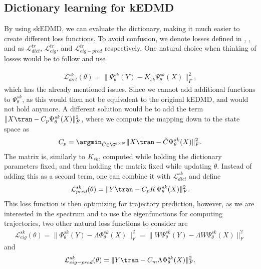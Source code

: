 \documentclass{article}
\begin{document}
\subsection{Dictionary learning for kEDMD}
By using skEDMD, we can evaluate the dictionary, making it much easier to create different loss functions. To avoid confusion, we denote losses defined in , , and  as \(\mathcal{L}^{tr}_{dict}\), \(\mathcal{L}^{tr}_{eig}\), and \(\mathcal{L}^{tr}_{eig-pred}\) respectively. One natural choice when thinking of losses would be to follow  and use

\begin{align*}
    \mathcal{L}^{sk}_{dict}(\theta) = \lVert \Psi^{sk}_{\theta}(Y) - K_{sk} \Psi^{sk}_{\theta}(X)\rVert_F^2,
\end{align*}
which has the already mentioned issues. Since we cannot add additional functions to \(\Psi^{sk}_{\theta}\), as this would then not be equivalent to the original kEDMD, and  would not hold anymore. A different solution would be to add the term \(\lVert X\tran - C_p\Psi^{sk}_{\theta}(X)\rVert^2_F\), where we compute the mapping down to the state space as 
\begin{align*}
    C_p = \argmin_{\Tilde C \in \C^{d \times N}} \lVert X\tran - \Tilde C\Psi^{sk}_{\theta}(X) \rVert_F^2.
\end{align*}
The matrix is, similarly to \(K_{sk}\), computed while holding the dictionary parameters fixed, and then holding the matrix fixed while updating \(\theta\). Instead of adding this as a second term, one can combine it with \(\mathcal{L}^{sk}_{dict}\) and define
\begin{align*}
    \mathcal{L}^{sk}_{pred}(\theta) = \lVert Y\tran - C_pK\Psi^{sk}_{\theta}(X)\rVert^2_F.
\end{align*}
This loss function is then optimizing for trajectory prediction, however, as we are interested in the spectrum and to use the eigenfunctions for computing trajectories, two other natural loss functions to consider are
\begin{align*}
    \mathcal{L}^{sk}_{eig}(\theta) = \lVert \Phi^{sk}_{\theta}(Y) - \Lambda \Phi^{sk}_{\theta}(X) \rVert_F^2 = \lVert W\Psi^{sk}_{\theta}(Y) - \Lambda  W\Psi^{sk}_{\theta}(X) \rVert_F^2  
\end{align*}
and
\begin{align*}
    \mathcal{L}^{sk}_{eig-pred}(\theta) = \lVert Y\tran - C_m\Lambda \Phi^{sk}_{\theta}(X) \rVert_F^2.
\end{align*}
\end{document}
